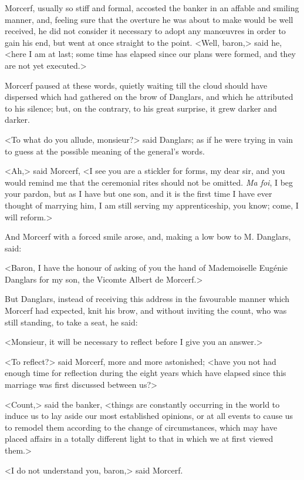  Morcerf, usually so stiff and formal, accosted the banker in an affable and smiling manner, and, feeling sure that the overture he was about to make would be well received, he did not consider it necessary to adopt any manœuvres in order to gain his end, but went at once straight to the point.  <Well, baron,> said he, <here I am at last; some time has elapsed since our plans were formed, and they are not yet executed.> 

 Morcerf paused at these words, quietly waiting till the cloud should have dispersed which had gathered on the brow of Danglars, and which he attributed to his silence; but, on the contrary, to his great surprise, it grew darker and darker. 

 <To what do you allude, monsieur?> said Danglars; as if he were trying in vain to guess at the possible meaning of the general's words. 

 <Ah,> said Morcerf, <I see you are a stickler for forms, my dear sir, and you would remind me that the ceremonial rites should not be omitted. \textit{Ma foi}, I beg your pardon, but as I have but one son, and it is the first time I have ever thought of marrying him, I am still serving my apprenticeship, you know; come, I will reform.> 

 And Morcerf with a forced smile arose, and, making a low bow to M. Danglars, said: 

 <Baron, I have the honour of asking of you the hand of Mademoiselle Eugénie Danglars for my son, the Vicomte Albert de Morcerf.> 

 But Danglars, instead of receiving this address in the favourable manner which Morcerf had expected, knit his brow, and without inviting the count, who was still standing, to take a seat, he said: 

 <Monsieur, it will be necessary to reflect before I give you an answer.> 

 <To reflect?> said Morcerf, more and more astonished; <have you not had enough time for reflection during the eight years which have elapsed since this marriage was first discussed between us?> 

 <Count,> said the banker, <things are constantly occurring in the world to induce us to lay aside our most established opinions, or at all events to cause us to remodel them according to the change of circumstances, which may have placed affairs in a totally different light to that in which we at first viewed them.> 

 <I do not understand you, baron,> said Morcerf. 

